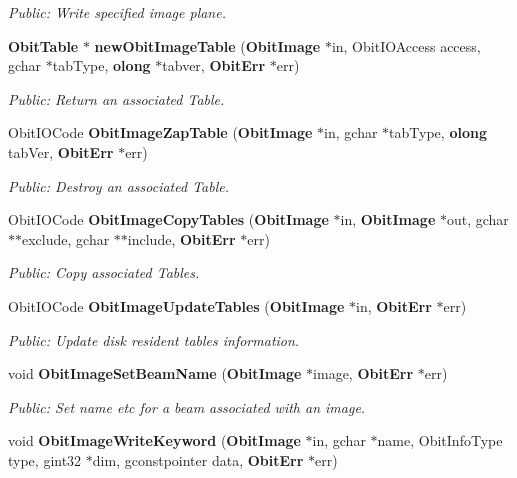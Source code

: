 \begin{CompactItemize}
\begin{CompactList}\small\item\em Public: Write specified image plane. \item\end{CompactList}\item 
{\bf Obit\-Table} $\ast$ {\bf new\-Obit\-Image\-Table} ({\bf Obit\-Image} $\ast$in, Obit\-IOAccess access, gchar $\ast$tab\-Type, {\bf olong} $\ast$tabver, {\bf Obit\-Err} $\ast$err)
\begin{CompactList}\small\item\em Public: Return an associated Table. \item\end{CompactList}\item 
Obit\-IOCode {\bf Obit\-Image\-Zap\-Table} ({\bf Obit\-Image} $\ast$in, gchar $\ast$tab\-Type, {\bf olong} tab\-Ver, {\bf Obit\-Err} $\ast$err)
\begin{CompactList}\small\item\em Public: Destroy an associated Table. \item\end{CompactList}\item 
Obit\-IOCode {\bf Obit\-Image\-Copy\-Tables} ({\bf Obit\-Image} $\ast$in, {\bf Obit\-Image} $\ast$out, gchar $\ast$$\ast$exclude, gchar $\ast$$\ast$include, {\bf Obit\-Err} $\ast$err)
\begin{CompactList}\small\item\em Public: Copy associated Tables. \item\end{CompactList}\item 
Obit\-IOCode {\bf Obit\-Image\-Update\-Tables} ({\bf Obit\-Image} $\ast$in, {\bf Obit\-Err} $\ast$err)
\begin{CompactList}\small\item\em Public: Update disk resident tables information. \item\end{CompactList}\item 
void {\bf Obit\-Image\-Set\-Beam\-Name} ({\bf Obit\-Image} $\ast$image, {\bf Obit\-Err} $\ast$err)
\begin{CompactList}\small\item\em Public: Set name etc for a beam associated with an image. \item\end{CompactList}\item 
void {\bf Obit\-Image\-Write\-Keyword} ({\bf Obit\-Image} $\ast$in, gchar $\ast$name, Obit\-Info\-Type type, gint32 $\ast$dim, gconstpointer data, {\bf Obit\-Err} $\ast$err)

\end{CompactItemize}
